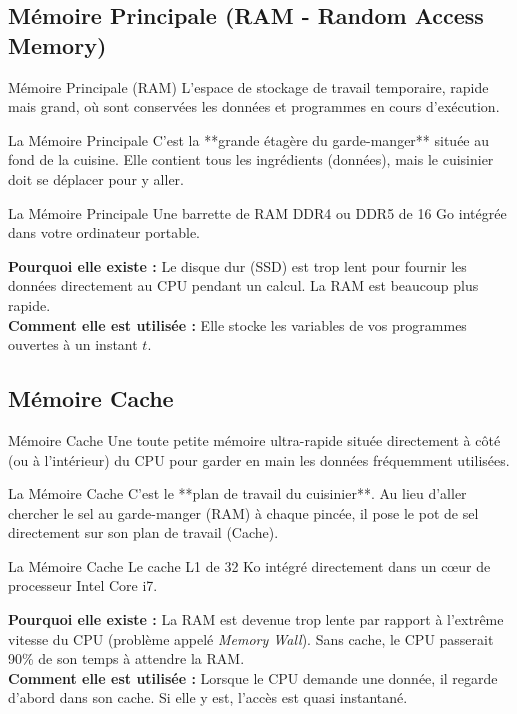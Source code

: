 \documentclass[12pt,a4paper]{article}
\begin{document}
\subsection{Mémoire Principale (RAM - Random Access Memory)}
\begin{definitionbox}{Mémoire Principale (RAM)}
L'espace de stockage de travail temporaire, rapide mais grand, où sont conservées les données et programmes en cours d'exécution.
\end{definitionbox}

\begin{analogybox}{La Mémoire Principale}
C'est la **grande étagère du garde-manger** située au fond de la cuisine. Elle contient tous les ingrédients (données), mais le cuisinier doit se déplacer pour y aller.
\end{analogybox}

\begin{examplebox}{La Mémoire Principale}
Une barrette de RAM DDR4 ou DDR5 de 16 Go intégrée dans votre ordinateur portable.
\end{examplebox}
\textbf{Pourquoi elle existe :} Le disque dur (SSD) est trop lent pour fournir les données directement au CPU pendant un calcul. La RAM est beaucoup plus rapide.\\
\textbf{Comment elle est utilisée :} Elle stocke les variables de vos programmes ouvertes à un instant $t$.

\subsection{Mémoire Cache}
\begin{definitionbox}{Mémoire Cache}
Une toute petite mémoire ultra-rapide située directement à côté (ou à l'intérieur) du CPU pour garder en main les données fréquemment utilisées.
\end{definitionbox}

\begin{analogybox}{La Mémoire Cache}
C'est le **plan de travail du cuisinier**. Au lieu d'aller chercher le sel au garde-manger (RAM) à chaque pincée, il pose le pot de sel directement sur son plan de travail (Cache).
\end{analogybox}

\begin{examplebox}{La Mémoire Cache}
Le cache L1 de 32 Ko intégré directement dans un cœur de processeur Intel Core i7.
\end{examplebox}
\textbf{Pourquoi elle existe :} La RAM est devenue trop lente par rapport à l'extrême vitesse du CPU (problème appelé \textit{Memory Wall}). Sans cache, le CPU passerait 90\% de son temps à attendre la RAM.\\
\textbf{Comment elle est utilisée :} Lorsque le CPU demande une donnée, il regarde d'abord dans son cache. Si elle y est, l'accès est quasi instantané.
\end{document}
